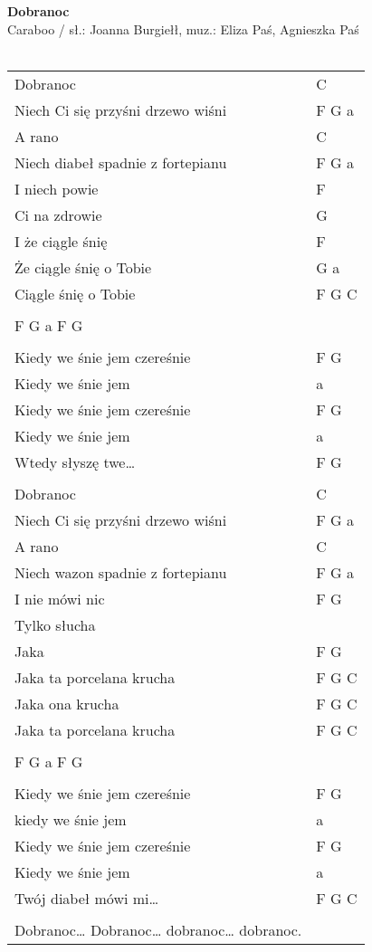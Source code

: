 \documentclass[a5paper]{article}
\begin{document}


\noindent
\fontsize{12pt}{15pt}\selectfont
\textbf{Dobranoc} \\
\fontsize{8pt}{10pt}\selectfont
Caraboo / sł.: Joanna Burgiełł, muz.: Eliza Paś, Agnieszka Paś \\ \\
\fontsize{10pt}{12pt}\selectfont
{}
\begin{tabular}{@{}p{8.00cm}p{3cm}@{}}
\noindent
Dobranoc & C \\
Niech Ci się przyśni drzewo wiśni & F G a \\
A rano & C \\
Niech diabeł spadnie z fortepianu & F G a \\
I niech powie & F \\
Ci na zdrowie & G \\
I że ciągle śnię & F \\
Że ciągle śnię o Tobie & G a \\
Ciągle śnię o Tobie & F G C \\ \\
 
F G a F G \\ \\

Kiedy we śnie jem czereśnie & F G \\
Kiedy we śnie jem & a \\
Kiedy we śnie jem czereśnie & F G \\
Kiedy we śnie jem & a \\
Wtedy słyszę twe… & F G \\ \\
 
Dobranoc & C \\
Niech Ci się przyśni drzewo wiśni & F G a \\
A rano & C \\
Niech wazon spadnie z fortepianu & F G a \\
I nie mówi nic & F G \\
Tylko słucha \\
Jaka & F G \\
Jaka ta porcelana krucha & F G C \\
Jaka ona krucha & F G C \\
Jaka ta porcelana krucha & F G C \\ \\

F G a F G \\ \\

Kiedy we śnie jem czereśnie & F G \\
kiedy we śnie jem & a \\
Kiedy we śnie jem czereśnie & F G \\
Kiedy we śnie jem & a \\
Twój diabeł mówi mi… & F G C \\ \\
 
Dobranoc… Dobranoc… dobranoc… dobranoc.
\end{tabular}
\end{document}

